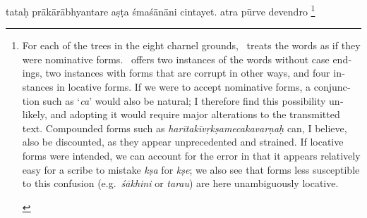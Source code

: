 \documentclass[naipra.tex]{subfiles}
\begin{document}
\begin{sanskrit}
\pstart
tataḥ prākārābhyantare aṣṭa śmaśānāni cintayet.
atra pūrve devendro \footnote{\begin{english}
	For each of the trees in the eight charnel grounds, \TIB\ treats the words as if they were nominative forms.
	\MSN\ offers two instances of the words without case endings, two instances with forms that are corrupt in other ways, and four instances in locative forms.
	If we were to accept nominative forms, a conjunction such as `\emph{ca}' would also be natural; I therefore find this possibility unlikely, and adopting it would require major alterations to the transmitted text. 
	Compounded forms such as \emph{harītakīvṛkṣamecakavarṇaḥ} can, I believe, also be discounted, as they appear unprecedented and strained.
	If locative forms were intended, we can account for the error in that it appears relatively easy for a scribe to mistake \emph{kṣa} for \emph{kṣe}; we also see that forms less susceptible to this confusion (e.g.\ \emph{śākhini} or \emph{tarau}) are here unambiguously locative. 


\end{english}}
\end{sanskrit}
\end{document}
